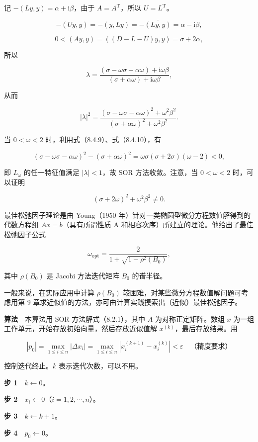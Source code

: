记 \(-(Ly,y)=\alpha+\mathrm i\beta\)，由于 \(A=A^{\mathrm T}\)，所以 \(U=L^{\mathrm T}\)。

\[
-(Uy,y)=-(y,Ly)=-\overline{(Ly,y)}=\alpha-\mathrm i\beta,
\]

\[
0<(Ay,y)=((D-L-U)y,y)=\sigma+2\alpha,
\tag{8.4.10}
\]

所以

\[
\lambda=\frac{(\sigma-\omega\sigma-\alpha\omega)+\mathrm i\omega\beta}{(\sigma+\alpha\omega)+\mathrm i\omega\beta},
\]

从而

\[
|\lambda|^2=\frac{(\sigma-\omega\sigma-\alpha\omega)^2+\omega^2\beta^2}{(\sigma+\alpha\omega)^2+\omega^2\beta^2}.
\]

当 \(0<\omega<2\) 时，利用式（8.4.9）、式（8.4.10），有

\[
(\sigma-\omega\sigma-\alpha\omega)^2-(\sigma+\alpha\omega)^2
=\omega\sigma(\sigma+2\sigma)(\omega-2)<0,
\]

即 \(L_\omega\) 的任一特征值满足 \(|\lambda|<1\)，故 SOR 方法收敛。注意，当 \(0<\omega<2\) 时，可以证明

\[
(\sigma+2\omega)^2+\omega^2\beta^2\neq0.
\]

最佳松弛因子理论是由 Young（1950 年）针对一类椭圆型微分方程数值解得到的代数方程组 \(Ax=b\)（具有所谓性质 A 和相容次序）所建立的理论。他给出了最佳松弛因子公式

\[
\omega_{\mathrm{opt}}=\frac2{1+\sqrt{1-\rho^2(B_0)}},
\]

其中 \(\rho(B_0)\) 是 Jacobi 方法迭代矩阵 \(B_0\) 的谱半径。

一般来说，在实际应用中计算 \(\rho(B_0)\) 较困难，对某些微分方程数值解问题可考虑用第 9 章求近似值的方法，亦可由计算实践摸索出（近似）最佳松弛因子。

\textbf{算法}　本算法用 SOR 方法解式（8.2.1），其中 \(A\) 为对称正定矩阵。数组 \(x\) 为一组工作单元，开始存放初始向量，然后存放近似值解 \(x^{(k)}\)，最后存放结果。用

\[
|p_0|=\max_{1\leqslant i\leqslant n}|\Delta x_i|=\max_{1\leqslant i\leqslant n}|x_i^{(k+1)}-x_i^{(k)}|<\varepsilon\quad\text{（精度要求）}
\]

控制迭代终止。\(k\) 表示迭代次数，可以不用。

\textbf{步 1}　\(k\leftarrow0\)。

\textbf{步 2}　\(x_i\leftarrow0\)（\(i=1,2,\cdots,n\)）。

\textbf{步 3}　\(k\leftarrow k+1\)。

\textbf{步 4}　\(p_0\leftarrow0\)。


